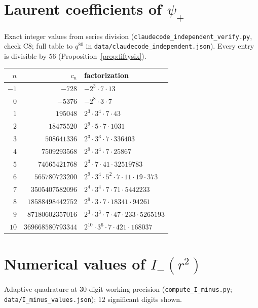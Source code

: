 \documentclass[11pt,reqno]{amsart}
\theoremstyle{plain}
\theoremstyle{definition}
\theoremstyle{remark}
\newcommand{\psip}{\psi_{+}}
\newcommand{\Imm}{I_{-}}
\begin{document}
\section{Laurent coefficients of \texorpdfstring{$\psip$}{psi+}}
\label{app:laurent}

Exact integer values from series division
(\texttt{claudecode\_independent\_verify.py}, check C8; full table to
$q^{80}$ in \texttt{data/claudecode\_independent.json}).  Every entry
is divisible by $56$ (Proposition~\ref{prop:fiftysix}).

\begin{center}
\small
\begin{tabular}{rrl}
\toprule
$n$ & $c_n$ & factorization \\
\midrule
$-1$ & $-728$ & $-2^3\cdot7\cdot13$ \\
$0$ & $-5376$ & $-2^8\cdot3\cdot7$ \\
$1$ & $195048$ & $2^3\cdot3^4\cdot7\cdot43$ \\
$2$ & $18475520$ & $2^9\cdot5\cdot7\cdot1031$ \\
$3$ & $508641336$ & $2^3\cdot3^3\cdot7\cdot336403$ \\
$4$ & $7509293568$ & $2^9\cdot3^4\cdot7\cdot25867$ \\
$5$ & $74665421768$ & $2^3\cdot7\cdot41\cdot32519783$ \\
$6$ & $565780723200$ & $2^9\cdot3^4\cdot5^2\cdot7\cdot11\cdot19\cdot373$ \\
$7$ & $3505407582096$ & $2^4\cdot3^4\cdot7\cdot71\cdot5442233$ \\
$8$ & $18588498442752$ & $2^9\cdot3\cdot7\cdot18341\cdot94261$ \\
$9$ & $87180602357016$ & $2^3\cdot3^3\cdot7\cdot47\cdot233\cdot5265193$ \\
$10$ & $369668580793344$ & $2^{10}\cdot3^6\cdot7\cdot421\cdot168037$ \\
\bottomrule
\end{tabular}
\end{center}

\section{Numerical values of \texorpdfstring{$\Imm(r^2)$}{I-(r2)}}
\label{app:Iminus}

Adaptive quadrature at $30$-digit working precision
(\texttt{compute\_I\_minus.py}; \texttt{data/I\_minus\_values.json});
$12$ significant digits shown.
\end{document}
